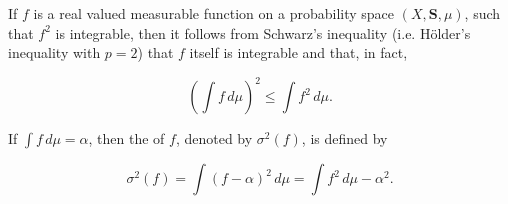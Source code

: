 If $f$ is a real valued measurable function on a probability space $(X, \mathbf{S}, \mu)$, such that $f^2$ is integrable, then it follows from Schwarz's inequality (i.e. Hölder's inequality with $p = 2$) that $f$ itself is integrable and that, in fact,

$$\left( \int f \, d\mu \right)^2 \leq \int f^2 \, d\mu.$$

If $\int f \, d\mu = \alpha$, then the  of $f$, denoted by $\sigma^2(f)$, is defined by

$$\sigma^2(f) = \int (f - \alpha)^2 \, d\mu = \int f^2 \, d\mu - \alpha^2.$$
